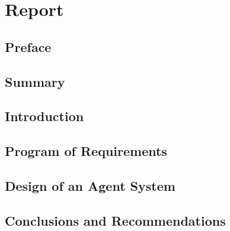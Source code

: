 \part{Report}

\chapter*{Preface}

\chapter*{Summary}

\chapter*{Introduction}

\chapter{Program of Requirements}





\chapter{Design of an Agent System}

\chapter{Conclusions and Recommendations}